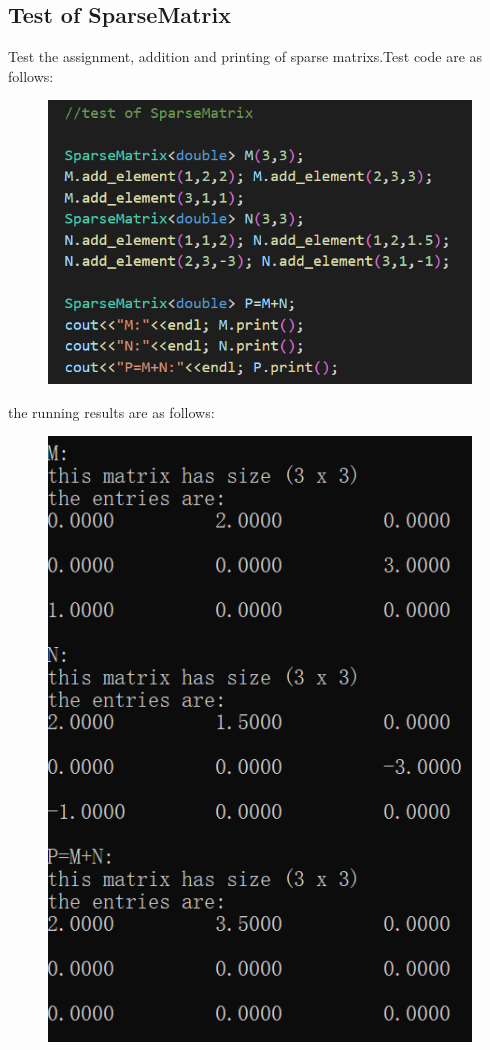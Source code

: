\documentclass[12pt]{article}
\begin{document}
\subsection{Test of SparseMatrix}
Test the assignment, addition and printing of sparse matrixs.Test code are as follows:
\begin{figure}[H]
    \centering
    \includegraphics{pic5.png}
\end{figure}
the running results are as follows:
\begin{figure}[H]
    \centering
    \includegraphics{pic6.png}
\end{figure}
\end{document}
